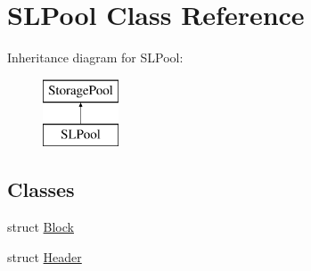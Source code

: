\hypertarget{class_s_l_pool}{}\section{S\+L\+Pool Class Reference}
\label{class_s_l_pool}
Inheritance diagram for S\+L\+Pool\+:\begin{figure}[H]
\begin{center}
\leavevmode
\includegraphics[height=2.000000cm]{class_s_l_pool}
\end{center}
\end{figure}
\subsection*{Classes}
\begin{DoxyCompactItemize}
\item 
struct \hyperlink{struct_s_l_pool_1_1_block}{Block}
\item 
struct \hyperlink{struct_s_l_pool_1_1_header}{Header}
\end{DoxyCompactItemize}
